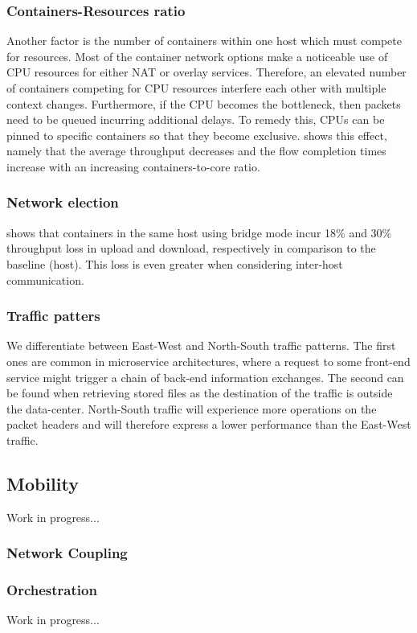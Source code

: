 \documentclass[conference]{IEEEtran}
\begin{document}
\subsubsection{Containers-Resources ratio}
Another factor is the number of containers within one host which must compete for resources. Most of the container network options make a noticeable use of CPU resources for either NAT or overlay services. Therefore, an elevated number of containers competing for CPU resources interfere each other with multiple context changes. Furthermore, if the CPU becomes the bottleneck, then packets need to be queued incurring additional delays. To remedy this, CPUs can be pinned to specific containers so that they become exclusive. \cite{Boeira:2021} shows this effect, namely that the average throughput decreases and the flow completion times increase with an increasing containers-to-core ratio. 
\subsubsection{Network election}
\cite{IEEE_INFOCOM_2018:K. Suo} shows that containers in the same host using bridge mode incur 18\% and 30\% throughput loss in upload and download, respectively in comparison to the baseline (host). This loss is even greater when considering inter-host communication. 

\subsubsection{Traffic patters}
We differentiate between East-West and North-South traffic patterns. The first ones are common in microservice architectures, where a request to some front-end service might trigger a chain of back-end information exchanges. The second can be found when retrieving stored files as the destination of the traffic is outside the data-center. North-South traffic will experience more operations on the packet headers and will therefore express a lower performance than the East-West traffic.
\subsection{Mobility}
Work in progress...

\subsubsection{Network Coupling}
		
\subsubsection{Orchestration}
Work in progress...
\end{document}
